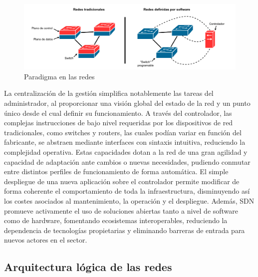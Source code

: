 \begin{figure}[ht!]
\centering
\includegraphics[width=\textwidth]{fig/02_sota/sota_1_sdn_idea.drawio.pdf}
\caption{Paradigma en las redes }
\label{fig:sdn_paradigma}
\end{figure}

La centralización de la gestión simplifica notablemente las tareas del administrador, al proporcionar una visión global del estado de la red y un punto único desde el cual definir su funcionamiento. A través del controlador, las complejas instrucciones de bajo nivel requeridas por los dispositivos de red tradicionales, como switches y routers, las cuales podían variar en función del fabricante, se abstraen mediante interfaces con sintaxis intuitiva, reduciendo la complejidad operativa. Estas capacidades dotan a la red de una gran agilidad y capacidad de adaptación ante cambios o nuevas necesidades, pudiendo conmutar entre distintos perfiles de funcionamiento de forma automática. El simple despliegue de una nueva aplicación sobre el controlador permite modificar de forma coherente el comportamiento de toda la infraestructura, disminuyendo así los costes asociados al mantenimiento, la operación y el despliegue. Además, SDN promueve activamente el uso de soluciones abiertas tanto a nivel de software como de hardware, fomentando ecosistemas interoperables, reduciendo la dependencia de tecnologías propietarias y eliminando barreras de entrada para nuevos actores en el sector.

\subsection{Arquitectura lógica de las redes }
\label{subsec:arquitectura_sdn}


